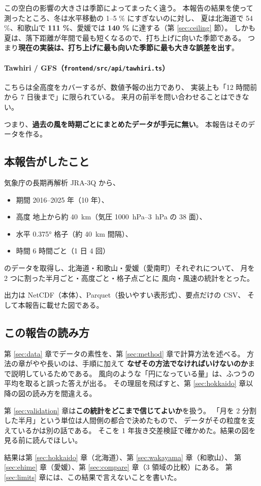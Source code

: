 この空白の影響の大きさは季節によってまったく違う。
本報告の結果を使って測ったところ、冬は水平移動の 1--5 \% にすぎないのに対し、
夏は北海道で 54 \%、和歌山で \textbf{111 \%}、愛媛では \textbf{140 \%} に達する（第 \ref{sec:ceiling} 節）。
しかも夏は、落下距離が年間で最も短くなるので、打ち上げに向いた季節である。
つまり\textbf{現在の実装は、打ち上げに最も向いた季節に最も大きな誤差を出す}。

\paragraph{Tawhiri / GFS（\texttt{frontend/src/api/tawhiri.ts}）}
こちらは全高度をカバーするが、数値予報の出力であり、
実装上も「12 時間前から 7 日後まで」に限られている。
来月の前半を問い合わせることはできない。

つまり、\textbf{過去の風を時期ごとにまとめたデータが手元に無い}。
本報告はそのデータを作る。

\subsection{本報告がしたこと}

気象庁の長期再解析 JRA-3Q から、

\begin{itemize}
  \item 期間 2016--2025 年（10 年）、
  \item 高度 地上から約 \SI{40}{\kilo\metre}（気圧 \SIrange{1000}{3}{\hecto\pascal} の 38 面）、
  \item 水平 \ang{0.375} 格子（約 \SI{40}{\kilo\metre} 間隔）、
  \item 時間 6 時間ごと（1 日 4 回）
\end{itemize}

のデータを取得し、北海道・和歌山・愛媛（愛南町）それぞれについて、
月を 2 つに割った半月ごと・高度ごと・格子点ごとに
風向・風速の統計をとった。

出力は NetCDF（本体）、Parquet（扱いやすい表形式）、要点だけの CSV、
そして本報告に載せた図である。

\subsection{この報告の読み方}

第 \ref{sec:data} 章でデータの素性を、第 \ref{sec:method} 章で計算方法を述べる。
方法の章がやや長いのは、手順に加えて
\textbf{なぜその方法でなければいけないのか}まで説明しているためである。
風向のような「円になっている量」は、ふつうの平均を取ると誤った答えが出る。
その理屈を飛ばすと、第 \ref{sec:hokkaido} 章以降の図の読み方を間違える。

第 \ref{sec:validation} 章は\textbf{この統計をどこまで信じてよいか}を扱う。
「月を 2 分割した半月」という単位は人間側の都合で決めたもので、
データがその粒度を支えているかは別の話である。
そこを 1 年抜き交差検証で確かめた。結果の図を見る前に読んでほしい。

結果は第 \ref{sec:hokkaido} 章（北海道）、第 \ref{sec:wakayama} 章（和歌山）、
第 \ref{sec:ehime} 章（愛媛）、第 \ref{sec:compare} 章（3 領域の比較）にある。
第 \ref{sec:limits} 章には、この結果で言えないことを書いた。
